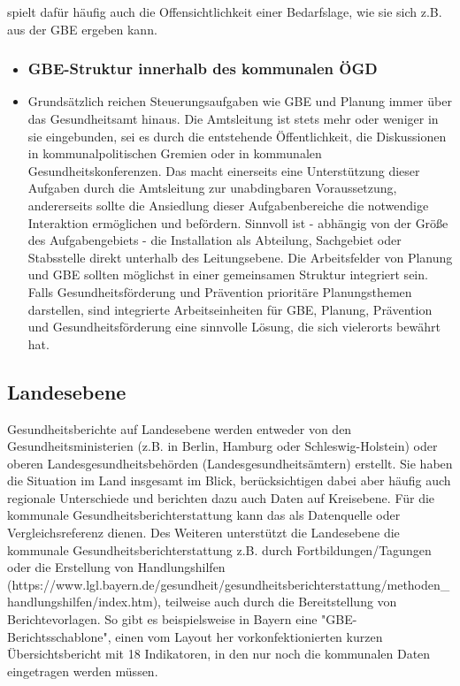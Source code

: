 \documentclass{article}
\begin{document}
\begin{itemize}
spielt dafür häufig auch die Offensichtlichkeit einer Bedarfslage, wie sie sich z.B. aus der GBE ergeben kann.


\end{itemize}
\begin{itemize}
\item \subsubsection{GBE-Struktur innerhalb des kommunalen ÖGD}\label{H718856}



\item Grundsätzlich reichen Steuerungsaufgaben wie GBE und Planung immer über das Gesundheitsamt hinaus. Die Amtsleitung ist stets mehr oder weniger in sie eingebunden, sei es durch die entstehende Öffentlichkeit, die Diskussionen in kommunalpolitischen Gremien oder in kommunalen Gesundheitskonferenzen. Das macht einerseits eine Unterstützung dieser Aufgaben durch die Amtsleitung zur unabdingbaren Voraussetzung, andererseits sollte die Ansiedlung dieser Aufgabenbereiche die notwendige Interaktion ermöglichen und befördern. Sinnvoll ist - abhängig von der Größe des Aufgabengebiets - die Installation als Abteilung, Sachgebiet oder Stabsstelle direkt unterhalb des Leitungsebene. Die Arbeitsfelder von Planung und GBE sollten möglichst in einer gemeinsamen Struktur integriert sein. Falls Gesundheitsförderung und Prävention prioritäre Planungsthemen darstellen, sind integrierte Arbeitseinheiten für GBE, Planung, Prävention und Gesundheitsförderung eine sinnvolle Lösung, die sich vielerorts bewährt hat.


\end{itemize}

\subsection{Landesebene}\label{H465502}



Gesundheitsberichte auf Landesebene werden entweder von den Gesundheitsministerien (z.B. in Berlin, Hamburg oder Schleswig-Holstein) oder oberen Landesgesundheitsbehörden (Landesgesundheitsämtern) erstellt. Sie haben die Situation im Land insgesamt im Blick, berücksichtigen dabei aber häufig auch regionale Unterschiede und berichten dazu auch Daten auf Kreisebene. Für die kommunale Gesundheitsberichterstattung kann das als Datenquelle oder Vergleichsreferenz dienen. Des Weiteren unterstützt die Landesebene die kommunale Gesundheitsberichterstattung z.B. durch Fortbildungen/Tagungen oder die Erstellung von Handlungshilfen (https://www.lgl.bayern.de/gesundheit/gesundheitsberichterstattung/methoden\_handlungshilfen/index.htm), teilweise auch durch die Bereitstellung von Berichtevorlagen. So gibt es beispielsweise in Bayern eine "GBE-Berichtsschablone", einen vom Layout her vorkonfektionierten kurzen Übersichtsbericht mit 18 Indikatoren, in den nur noch die kommunalen Daten eingetragen werden müssen.
\end{document}
